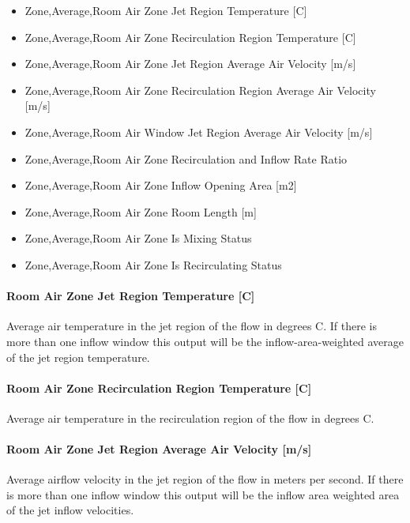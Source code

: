 \begin{itemize}
\item
  Zone,Average,Room Air Zone Jet Region Temperature {[}C{]}
\item
  Zone,Average,Room Air Zone Recirculation Region Temperature {[}C{]}
\item
  Zone,Average,Room Air Zone Jet Region Average Air Velocity {[}m/s{]}
\item
  Zone,Average,Room Air Zone Recirculation Region Average Air Velocity {[}m/s{]}
\item
  Zone,Average,Room Air Window Jet Region Average Air Velocity {[}m/s{]}
\item
  Zone,Average,Room Air Zone Recirculation and Inflow Rate Ratio
\item
  Zone,Average,Room Air Zone Inflow Opening Area {[}m2{]}
\item
  Zone,Average,Room Air Zone Room Length {[}m{]}
\item
  Zone,Average,Room Air Zone Is Mixing Status
\item
  Zone,Average,Room Air Zone Is Recirculating Status
\end{itemize}

\paragraph{Room Air Zone Jet Region Temperature {[}C{]}}\label{room-air-zone-jet-region-temperature-c}

Average air temperature in the jet region of the flow in degrees C. If there is more than one inflow window this output will be the inflow-area-weighted average of the jet region temperature.

\paragraph{Room Air Zone Recirculation Region Temperature {[}C{]}}\label{room-air-zone-recirculation-region-temperature-c}

Average air temperature in the recirculation region of the flow in degrees C.

\paragraph{Room Air Zone Jet Region Average Air Velocity {[}m/s{]}}\label{room-air-zone-jet-region-average-air-velocity-ms}

Average airflow velocity in the jet region of the flow in meters per second. If there is more than one inflow window this output will be the inflow area weighted area of the jet inflow velocities.

